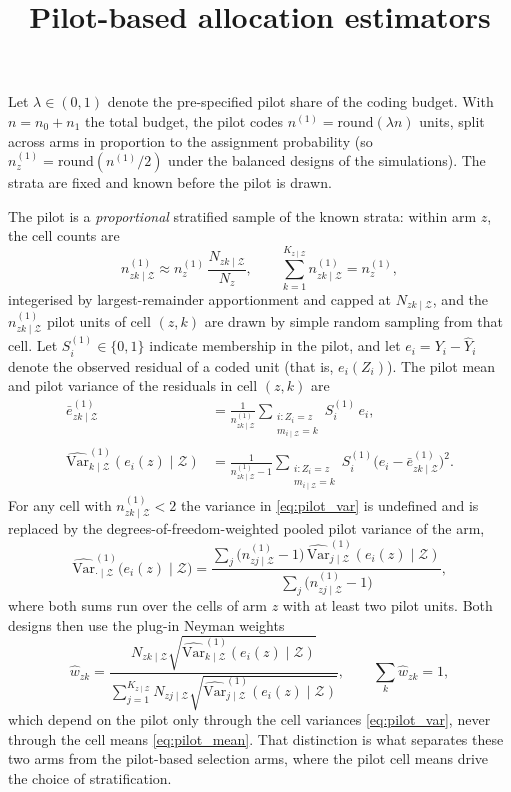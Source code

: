\documentclass[12pt]{article}
\title{Pilot-based allocation estimators}
\theoremstyle{remark}
\def\Var{\mbox{Var}}
\newcommand{\NzkZ}{N_{zk \mid\mathcal{Z}}}
\newcommand{\NzjZ}{N_{zj \mid\mathcal{Z}}}
\newcommand{\varkZpil}[1]{\widehat{\Var}^{(1)}_{k \mid \mathcal{Z}} \! \left ( #1 \right )}
\newcommand{\varjZpil}[1]{\widehat{\Var}^{(1)}_{j \mid \mathcal{Z}} \! \left ( #1 \right )}
\newcommand{\npzkZ}{n^{(1)}_{zk \mid \mathcal{Z}}}
\newcommand{\npzjZ}{n^{(1)}_{zj \mid \mathcal{Z}}}
\newcommand{\cellsum}[1]{\sum_{\substack{i:Z_i=#1 \\ m_{i \mid \mathcal{Z}} = k}}}
\begin{document}
\maketitle


Let $\lambda \in (0,1)$ denote the pre-specified pilot share of the coding budget. With $n = n_0 + n_1$ the total budget, the pilot codes $n^{(1)} = \mathrm{round}(\lambda n)$ units, split across arms in proportion to the assignment probability (so $n^{(1)}_z = \mathrm{round}(n^{(1)}/2)$ under the balanced designs of the simulations). The strata are fixed and known before the pilot is drawn.

The pilot is a \emph{proportional} stratified sample of the known strata: within arm $z$, the cell counts are
\begin{equation}
\label{eq:pilot_counts}
\npzkZ \approx n^{(1)}_z \, \frac{\NzkZ}{N_z}, \qquad \sum_{k=1}^{K_{z \mid \mathcal{Z}}} \npzkZ = n^{(1)}_z ,
\end{equation}
integerised by largest-remainder apportionment and capped at $\NzkZ$, and the $\npzkZ$ pilot units of cell $(z,k)$ are drawn by simple random sampling from that cell. Let $S^{(1)}_i \in \{0,1\}$ indicate membership in the pilot, and let $e_i = Y_i - \hat{Y}_i$ denote the observed residual of a coded unit (that is, $e_i(Z_i)$). The pilot mean and pilot variance of the residuals in cell $(z,k)$ are
\begin{align}
\bar{e}^{(1)}_{zk \mid \mathcal{Z}} &= \frac{1}{\npzkZ} \cellsum{z} S^{(1)}_i \, e_i , \label{eq:pilot_mean}\\
\varkZpil{e_i(z) \mid \mathcal{Z}} &= \frac{1}{\npzkZ - 1} \cellsum{z} S^{(1)}_i \big( e_i - \bar{e}^{(1)}_{zk \mid \mathcal{Z}} \big)^2 . \label{eq:pilot_var}
\end{align}
For any cell with $\npzkZ < 2$ the variance in \eqref{eq:pilot_var} is undefined and is replaced by the degrees-of-freedom-weighted pooled pilot variance of the arm,
\begin{equation}
\label{eq:pilot_var_pooled}
\widehat{\Var}^{(1)}_{\cdot \mid \mathcal{Z}}\big( e_i(z) \mid \mathcal{Z} \big)
 = \frac{\sum_{j} \big( \npzjZ - 1 \big)\, \varjZpil{e_i(z) \mid \mathcal{Z}}}{\sum_{j} \big( \npzjZ - 1 \big)} ,
\end{equation}
where both sums run over the cells of arm $z$ with at least two pilot units. 
Both designs then use the plug-in Neyman weights
\begin{equation}
\label{eq:plugin_weights}
\hat{w}_{zk} = \frac{\NzkZ \sqrt{\varkZpil{e_i(z) \mid \mathcal{Z}}}}{\sum_{j=1}^{K_{z \mid \mathcal{Z}}} \NzjZ \sqrt{\varjZpil{e_i(z) \mid \mathcal{Z}}}}, \qquad \sum_{k} \hat{w}_{zk} = 1,
\end{equation}
which depend on the pilot only through the cell variances \eqref{eq:pilot_var}, never through the cell means \eqref{eq:pilot_mean}. That distinction is what separates these two arms from the pilot-based selection arms, where the pilot cell means drive the choice of stratification.
\end{document}
